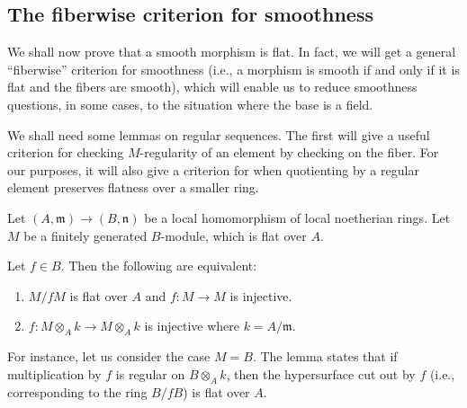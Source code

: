 \subsection{The fiberwise criterion for smoothness}

We shall now prove that a smooth morphism is flat. In fact, we will get
a general ``fiberwise'' criterion for smoothness (i.e., a morphism is smooth
if and only if it is flat and the fibers are smooth), which will enable
us to reduce smoothness questions, in some cases, to the situation where the
base is a field. 

We shall need some lemmas on regular sequences. 
The first will give a useful criterion for checking $M$-regularity of an
element by checking on the fiber.
For our purposes, it will also give a criterion for when quotienting by a
regular element preserves flatness over a smaller ring.

\begin{lemma} 
Let $(A, \mathfrak{m}) \to (B, \mathfrak{n})$ be a local homomorphism
of local noetherian 
rings.
Let $M$ be a finitely generated $B$-module, which is flat over $A$. 

Let $f \in B$. Then the following are equivalent:
\begin{enumerate}
\item $M/fM$ is flat over $A$ and $f: M \to M$ is injective.
\item $f: M \otimes_A k \to M \otimes_A k$ is injective where $k = A/\mathfrak{m}$.
\end{enumerate}
\end{lemma} 

For instance, let us consider the case $M = B$. The lemma states that if
multiplication by $f$ is regular on $B \otimes_A k$, then the hypersurface cut
out by $f$ (i.e., corresponding to the ring $B/fB$) is flat over $A$. 

